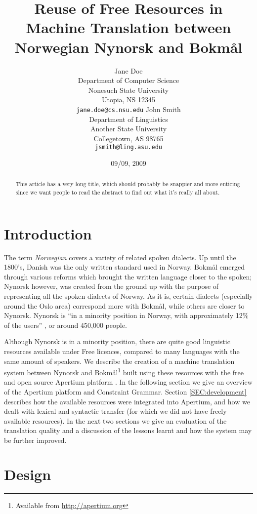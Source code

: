 \documentclass[11pt]{article}
\author{Jane Doe\\  Department of Computer Science \\  Nonesuch State University \\  Utopia, NS 12345 \\  {\tt jane.doe@cs.nsu.edu} \And  John Smith \\  Department of Linguistics \\  Another State University \\  Collegetown, AS 98765 \\    {\tt jsmith@ling.asu.edu}}
\title{Reuse of Free Resources in Machine Translation between Norwegian Nynorsk and Bokmål}
\date{09/09, 2009}
\begin{document}
\maketitle


\begin{abstract}
This article has a very long title, which should probably be snappier
  and more enticing since we want people to read the abstract to find
  out what it's really all about.
\end{abstract}

\section{Introduction}
\label{sec-1}

The term \emph{Norwegian} covers a variety of related spoken dialects. Up
until the 1800's, Danish was the only written standard used in
Norway. Bokmål emerged through various reforms which brought the
written language closer to the spoken; Nynorsk however, was created
from the ground up with the purpose of representing all the spoken
dialects of Norway. As it is, certain dialects (especially around the
Oslo area) correspond more with Bokmål, while others are closer to
Nynorsk. Nynorsk is ``in a minority position in Norway, with
approximately 12\% of the users'' \citep{everson2000sln}, or around
450,000 people. 

Although Nynorsk is in a minority position, there are quite good
linguistic resources available under Free licences, compared to many
languages with the same amount of speakers.  We describe the creation
of a machine translation system between Nynorsk and Bokmål\footnote{Available from \href{http://apertium.org}{http://apertium.org} } built
using these resources with the free and open source Apertium platform
\citep{corbi05oss}. In the following section we give an overview of
the Apertium platform and Constraint Grammar. Section
\ref{SEC:development} describes how the available resources were
integrated into Apertium, and how we dealt with lexical and syntactic
transfer (for which we did not have freely available resources). In
the next two sections we give an evaluation of the translation quality
and a discussion of the lessons learnt and how the system may be
further improved.

\section{Design}
\label{sec-2}
\end{document}
